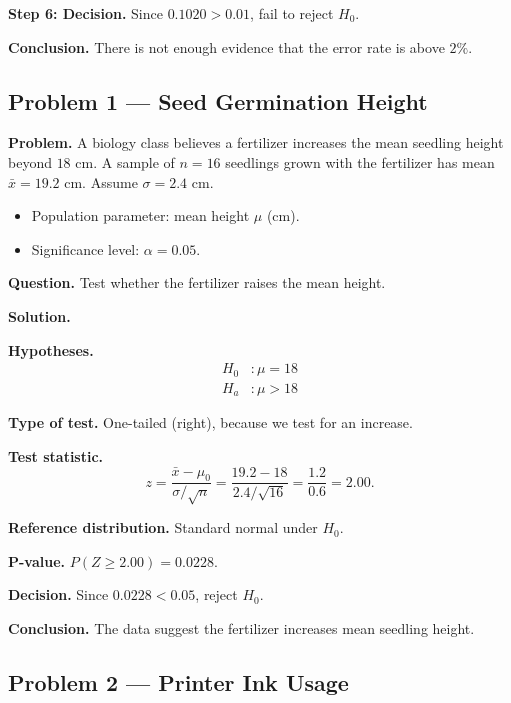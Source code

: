 	\textbf{Step 6: Decision.} Since $0.1020>0.01$, fail to reject $H_0$.
	
	\textbf{Conclusion.} There is not enough evidence that the error rate is above $2\%$.
	
	
	\hypertarget{c5-ex1}{}
	\subsection*{Problem 1 — Seed Germination Height}
	
	\textbf{Problem.} A biology class believes a fertilizer increases the mean seedling height beyond $18$ cm. A sample of $n=16$ seedlings grown with the fertilizer has mean $\bar{x}=19.2$ cm. Assume $\sigma=2.4$ cm.
	\begin{itemize}
		\item Population parameter: mean height $\mu$ (cm).
		\item Significance level: $\alpha=0.05$.
	\end{itemize}
	
	\textbf{Question.} Test whether the fertilizer raises the mean height.
	
	\textbf{Solution.}
	
	\textbf{Hypotheses.}
	\[
	\begin{aligned}
		H_0&: \mu = 18 \\
		H_a&: \mu > 18
	\end{aligned}
	\]
	
	\textbf{Type of test.} One-tailed (right), because we test for an increase.
	
	\textbf{Test statistic.}
	\[
	z = \frac{\bar{x}-\mu_0}{\sigma/\sqrt{n}} = \frac{19.2-18}{2.4/\sqrt{16}} = \frac{1.2}{0.6} = 2.00.
	\]
	
	\textbf{Reference distribution.} Standard normal under $H_0$.
	
	\textbf{P-value.} $P(Z\ge 2.00)=0.0228$.
	
	\textbf{Decision.} Since $0.0228<0.05$, reject $H_0$.
	
	\textbf{Conclusion.} The data suggest the fertilizer increases mean seedling height.
	
	\hypertarget{c5-ex2}{}
	\subsection*{Problem 2 — Printer Ink Usage}
	
